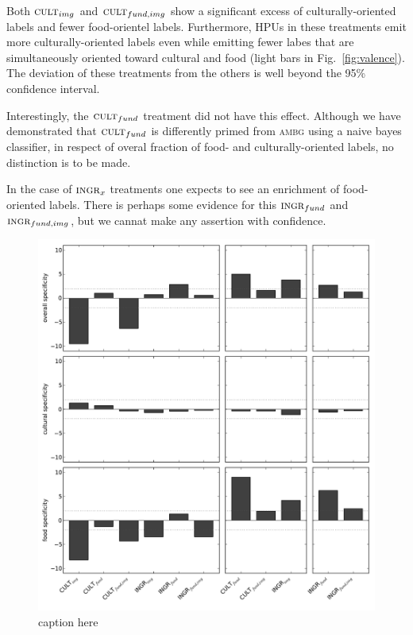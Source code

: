 \documentclass[letterpaper, 11pt, twocolumn]{article}
\begin{document}
Both $\textsc{cult}_{img}$ and $\textsc{cult}_{fund,img}$ show a significant
excess of culturally-oriented labels and fewer food-orientel labels.  
Furthermore, HPUs in these treatments emit more culturally-oriented labels 
even while emitting fewer labes that are simultaneously oriented toward 
cultural and food (light bars in Fig.~\ref{fig:valence}).
The deviation of these treatments from
the others is well beyond the 95\% confidence interval.

Interestingly, the $\textsc{cult}_{fund}$ treatment did not have this effect.
Although we have demonstrated that $\textsc{cult}_{fund}$ is differently
primed from \textsc{ambg} using a naive bayes classifier, in respect of 
overal fraction of food- and culturally-oriented labels, no distinction 
is to be made.

In the case of $\textsc{ingr}_x$ treatments one expects to see an 
enrichment of food-oriented labels. There is perhaps some evidence for this
$\textsc{ingr}_{fund}$ and $\textsc{ingr}_{fund,img}$, but we cannat make any
assertion with confidence.


\begin{figure}
	\includegraphics[scale=0.65]{../figs/specificity2.pdf}
	\caption{caption here}
	\label{fig:specificity}
\end{figure}
\end{document}
